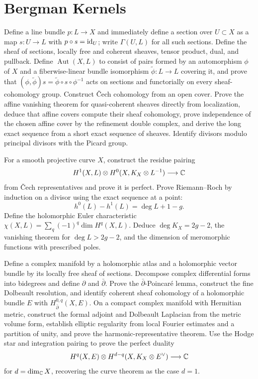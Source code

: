 \section{Bergman Kernels}

\begin{exercise}
Define a line bundle $p:L\to X$ and immediately define a section over
$U\subset X$ as a map $s:U\to L$ with $p\circ s=\operatorname{id}_U$; write
$\Gamma(U,L)$ for all such sections.  Define the sheaf of sections, locally
free and coherent sheaves, tensor product, dual, and pullback.  Define
$\operatorname{Aut}(X,L)$ to consist of pairs formed by an automorphism
$\phi$ of $X$ and a fiberwise-linear bundle isomorphism
$\widetilde\phi:L\to L$ covering it, and prove
that
$(\phi,\widetilde\phi)s=\widetilde\phi\circ s\circ\phi^{-1}$ acts on sections
and functorially on every sheaf-cohomology group.  Construct \v Cech
cohomology from an open cover.  Prove the affine vanishing theorem for
quasi-coherent sheaves directly from localization, deduce that affine covers
compute their sheaf cohomology, prove independence of the chosen affine cover
by the refinement double complex, and derive the long exact sequence from a
short exact sequence of sheaves.  Identify divisors modulo principal divisors
with the Picard group.
\end{exercise}

\begin{exercise}
For a smooth projective curve $X$, construct the residue pairing
\[
 H^1(X,L)\otimes H^0(X,K_X\otimes L^{-1})\longrightarrow\mathbb C
\]
from \v Cech representatives and prove it is perfect.  Prove Riemann--Roch by
induction on a divisor using the exact sequence at a point:
\[
 h^0(L)-h^1(L)=\deg L+1-g.
\]
Define the holomorphic Euler characteristic
$\chi(X,L)=\sum_q(-1)^q\dim H^q(X,L)$.
Deduce $\deg K_X=2g-2$, the vanishing theorem for $\deg L>2g-2$, and the
dimension of meromorphic functions with prescribed poles.
\end{exercise}

\begin{exercise}
Define a complex manifold by a holomorphic atlas and a holomorphic vector
bundle by its locally free sheaf of sections.  Decompose complex differential
forms into bidegrees and define $\partial$ and $\bar\partial$.  Prove the
$\bar\partial$-Poincar\'e lemma, construct the fine Dolbeault resolution, and
identify coherent sheaf cohomology of a holomorphic bundle $E$ with
$H^{0,q}_{\bar\partial}(X,E)$.  On a compact complex manifold with Hermitian
metric, construct the formal adjoint and Dolbeault Laplacian from the metric
volume form, establish elliptic regularity from local Fourier estimates and a
partition of unity, and prove the harmonic-representative theorem.  Use the
Hodge star and integration pairing to prove the perfect duality
\[
 H^q(X,E)\otimes H^{d-q}(X,K_X\otimes E^\vee)\longrightarrow\mathbb C
\]
for $d=\dim_\mathbb C X$, recovering the curve theorem as the case $d=1$.
\end{exercise}


